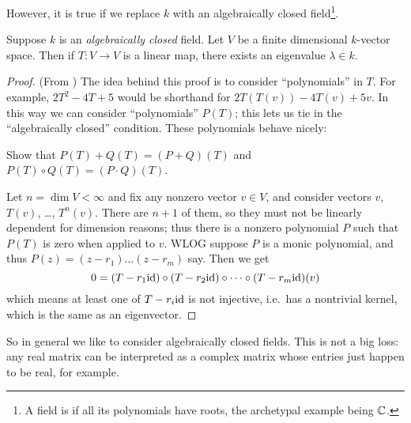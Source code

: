 However, it is true if we replace $k$ with an
algebraically closed field\footnote{A field is 
	if all its polynomials have roots,
	the archetypal example being $\mathbb C$.}.
\begin{theorem}
	Suppose $k$ is an \emph{algebraically closed} field.
	Let $V$ be a finite dimensional $k$-vector space.
	Then if $T \colon V \to V$ is a linear map,
	there exists an eigenvalue $\lambda \in k$.
\end{theorem}
\begin{proof}
	(From \cite{ref:axler})
	The idea behind this proof is to consider ``polynomials'' in $T$.
	For example, $2T^2-4T+5$ would be shorthand for $2T(T(v)) - 4T(v) + 5v$.
	In this way we can consider ``polynomials'' $P(T)$;
	this lets us tie in the ``algebraically closed'' condition.
	These polynomials behave nicely:
	\begin{ques}
		Show that $P(T)+Q(T) = (P+Q)(T)$ and $P(T) \circ Q(T) = (P \cdot Q)(T)$.
	\end{ques}

	Let $n = \dim V < \infty$ and fix any nonzero vector $v \in V$,
	and consider vectors $v$, $T(v)$, \dots, $T^n (v)$.
	There are $n+1$ of them,
	so they must not be linearly dependent for dimension reasons;
	thus there is a nonzero polynomial $P$ such that $P(T)$
	is zero when applied to $v$.
	WLOG suppose $P$ is a monic polynomial,
	and thus $P(z) = (z-r_1)\dots(z-r_m)$ say.
	Then we get
	\[ 0 = (T - r_1 \mathrm{id}) \circ (T - r_2 \mathrm{id}) \circ \dots
		\circ (T - r_m \mathrm{id})(v) \]
	which means at least one of $T - r_i \mathrm{id}$ is not injective,
	i.e.\ has a nontrivial kernel,
	which is the same as an eigenvector.
\end{proof}
So in general we like to consider algebraically closed fields.
This is not a big loss:
any real matrix can be interpreted as a complex matrix
whose entries just happen to be real, for example.


